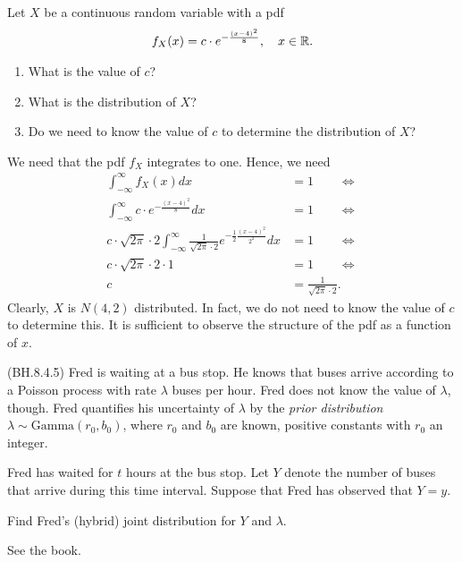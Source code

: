 \begin{exercise}
Let $X$ be a continuous random variable with a pdf
\begin{align}
    f_X(x) = c \cdot e^{-\frac{(x - 4)^2}{8}}, \quad x \in \mathbb{R}.
\end{align}
\begin{enumerate}
    \item What is the value of $c$?
    \item What is the distribution of $X$?
    \item Do we need to know the value of $c$ to determine the distribution of $X$?
\end{enumerate}
\begin{solution}
We need that the pdf $f_X$ integrates to one. Hence, we need
\begin{align}
    \int_{-\infty}^\infty f_X(x) dx &= 1 \qquad \iff \\
    \int_{-\infty}^\infty c \cdot e^{-\frac{(x - 4)^2}{8}} dx &= 1 \qquad \iff \\
    c \cdot \sqrt{2\pi}\cdot 2 \int_{-\infty}^\infty  \frac{1}{\sqrt{2\pi}\cdot 2} e^{-\frac{1}{2}\frac{(x - 4)^2}{2^2}} dx &= 1 \qquad \iff \\
    c \cdot \sqrt{2\pi}\cdot 2 \cdot 1 &= 1 \qquad \iff \\
    c &= \frac{1}{\sqrt{2\pi}\cdot 2}.
\end{align}
Clearly, $X$ is $N(4,2)$ distributed. In fact, we do not need to know the value of $c$ to determine this. It is sufficient to observe the structure of the pdf as a function of $x$.
\end{solution}
\end{exercise}


(BH.8.4.5) Fred is waiting at a bus stop. He knows that buses arrive according to a Poisson process with rate $\lambda$ buses per hour. Fred does not know the value of $\lambda$, though. Fred quantifies his uncertainty of $\lambda$ by the \textit{prior distribution} $\lambda \sim \text{Gamma}(r_0, b_0)$, where $r_0$ and $b_0$ are known, positive constants with $r_0$ an integer.

Fred has waited for $t$ hours at the bus stop. Let $Y$ denote the number of buses that arrive during this time interval. Suppose that Fred has observed that $Y=y$.

\begin{exercise}
Find Fred's (hybrid) joint distribution for $Y$ and $\lambda$.
\begin{solution}
See the book.
\end{solution}
\end{exercise}

